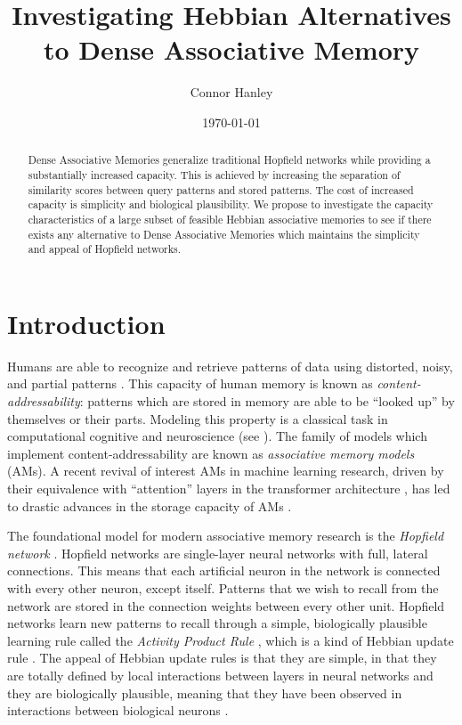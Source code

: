 \documentclass{article}
\title{Investigating Hebbian Alternatives to Dense Associative Memory}
\author{Connor Hanley}
\date{\today}
\theoremstyle{definition}
\begin{document}
\maketitle

\begin{abstract}
  Dense Associative Memories generalize traditional Hopfield networks
  while providing a substantially increased capacity. This is
  achieved by increasing
  the separation of similarity scores between query patterns and
  stored patterns.
  The cost of increased capacity is simplicity and biological
  plausibility. We propose
  to investigate the capacity characteristics of a large subset of
  feasible Hebbian
  associative memories to see if there exists any alternative to
  Dense Associative Memories which maintains the simplicity and
  appeal of Hopfield networks.
\end{abstract}

\section{Introduction}

Humans are able to recognize and retrieve patterns of data using distorted,
noisy, and partial patterns \parencite{rumelhart_general_1986}. This
capacity of human memory is known as \textit{content-addressability}: patterns
which are stored in memory are able to be ``looked up'' by themselves or their
parts. Modeling this property is a classical task in computational cognitive
and neuroscience (see \textcites{marr_simple_1971,little_existence_1974,
amari_learning_1972,nakano_associatron-model_1972,stanley_simulation_1976}).
The family of models which implement content-addressability are known
as \textit{associative memory models} (AMs).
A recent revival of interest AMs in machine learning research,
driven by their equivalence with ``attention'' layers in the transformer
architecture \parencites{vaswani_attention_2023, ramsauer_hopfield_2021},
has led to drastic advances in the storage capacity of AMs
\parencites{demircigil_model_2017,krotov_dense_2016,hu_provably_2024}.

The foundational model for modern associative memory research is the
\textit{Hopfield network}
\parencites{hopfield_neural_1982,hopfield_neurons_1984}.
Hopfield networks are single-layer neural networks with full, lateral
connections.
This means that each artificial neuron in the network is connected with every
other neuron, except itself. Patterns that we wish to recall from the network
are stored in the connection weights between every other unit. Hopfield
networks learn new patterns to recall through a simple, biologically plausible
learning rule called the \textit{Activity Product Rule}
\parencite{haykin_neural_2009},
which is a kind of Hebbian update rule \parencite{hebb_organization_1949}.
The appeal of Hebbian update rules is that they are simple, in that they
are totally defined by local interactions between layers in neural networks
and they are biologically plausible, meaning that they have been
observed in interactions
between biological neurons
\parencites{rolls_mechanisms_2013,bi_synaptic_1998,markram_regulation_1997}.
\end{document}
